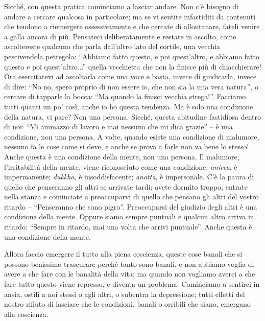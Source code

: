 Sicché, con questa pratica cominciamo a lasciar andare. Non c'è bisogno
di andare a cercare qualcosa in particolare; ma se vi sentite
infastiditi da contenuti che tendono a riemergere ossessivamente e che
cercate di allontanare, fateli venire a galla ancora di più. Pensateci
deliberatamente e restate in ascolto, come ascoltereste qualcuno che
parla dall'altro lato del cortile, una vecchia pescivendola pettegola:
``Abbiamo fatto questo, e poi quest'altro, e abbiamo fatto questo e poi
quest'altro...'' quella vecchietta che non la finisce più di
chiacchierare! Ora esercitatevi ad ascoltarla come una voce e basta,
invece di giudicarla, invece di dire: ``No no, spero proprio di non
essere io, che non sia la mia vera natura'', o cercare di tapparle la
bocca: ``Ma quando la finisci vecchia strega!''. Facciamo tutti quanti un
po' così, anche io ho questa tendenza. Ma è solo una condizione della
natura, vi pare? Non una persona. Sicché, questa abitudine fastidiosa
dentro di noi: ``Mi ammazzo di lavoro e mai nessuno che mi dica grazie'' –
è una condizione, non una persona. A volte, quando esiste una condizione
di malumore, nessuno fa le cose come si deve, e anche se prova a farle
non va bene lo stesso! Anche questa è una condizione della mente, non
una persona. Il malumore, l'irritabilità della mente, viene riconosciuto
come una condizione: \textit{anicca}, è impermanente; \textit{dukkha}, è insoddisfacente;
\textit{anattā}, è impersonale. C'è la paura di quello che penseranno gli altri
se arrivate tardi: avete dormito troppo, entrate nella stanza e
cominciate a preoccuparvi di quello che pensano gli altri del vostro
ritardo – ``Penseranno che sono pigro''. Preoccuparsi del giudizio degli
altri è una condizione della mente. Oppure siamo sempre puntuali e
qualcun altro arriva in ritardo: ``Sempre in ritardo, mai una volta che
arrivi puntuale''. Anche questa è una condizione della mente.

Allora faccio emergere il tutto alla piena coscienza, queste cose banali
che si possono benissimo trascurare perché tanto sono banali, e non
abbiamo voglia di avere a che fare con le banalità della vita; ma quando
non vogliamo averci a che fare tutto questo viene represso, e diventa un
problema. Cominciamo a sentirci in ansia, ostili a noi stessi o agli
altri, o subentra la depressione; tutti effetti del nostro rifiuto di
lasciare che le condizioni, banali o orribili che siano, emergano alla
coscienza.

